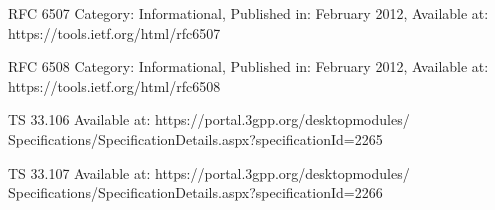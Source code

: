 \documentclass[runningheads,a4paper]{llncs} %
\begin{document}
\begin{thebibliography}{4}
 RFC 6507 Category: Informational, Published in: February 2012, Available at: https://tools.ietf.org/html/rfc6507

 RFC 6508 Category: Informational, Published in: February 2012, Available at: https://tools.ietf.org/html/rfc6508

 TS 33.106 Available at: https://portal.3gpp.org/desktopmodules/\\Specifications/SpecificationDetails.aspx?specificationId=2265

 TS 33.107 Available at: https://portal.3gpp.org/desktopmodules/\\Specifications/SpecificationDetails.aspx?specificationId=2266




\end{thebibliography}
\end{document}
